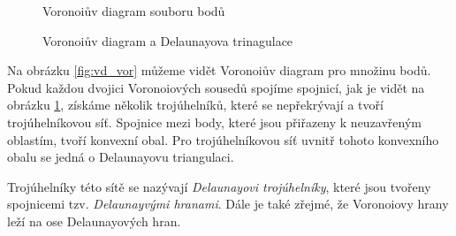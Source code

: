 \documentclass[12pt,a4paper]{article}
\begin{document}
\begin{figure}[h!]
\centering
\begin{floatrow}
{\caption{Voronoiův diagram souboru bodů}\label{fig:vd_vor}}
{\caption{Voronoiův diagram a Delaunayova trinagulace}\label{fig:vd_del}}
\end{floatrow}
\end{figure}

Na obrázku \ref{fig:vd_vor} můžeme vidět Voronoiův diagram pro množinu
bodů. Pokud každou dvojici Voronoiových sousedů spojíme spojnicí, jak
je vidět na obrázku \ref{fig:vd_del}, získáme několik trojúhelníků,
které se nepřekrývají a tvoří trojúhelníkovou síť. Spojnice mezi body,
které jsou přiřazeny k neuzavřeným oblastím, tvoří konvexní obal. Pro
trojúhelníkovou síť uvnitř tohoto konvexního obalu se jedná o
Delaunayovu triangulaci.

Trojúhelníky této sítě se nazývají \emph{Delaunayovi trojúhelníky},
které jsou tvořeny spojnicemi tzv. \emph{Delaunayvými hranami}. Dále
je také zřejmé, že Voronoiovy hrany leží na ose Delaunayových hran.


\newpage
\end{document}
